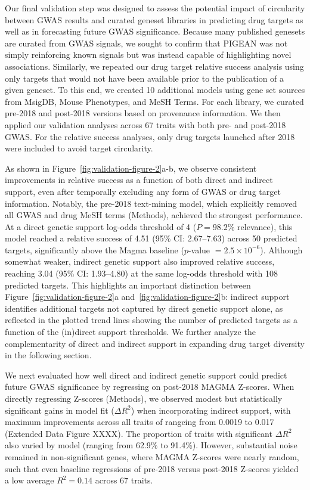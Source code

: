 \documentclass[sn-nature,lineno]{sn-jnl}%
\theoremstyle{thmstyleone}%
\theoremstyle{thmstyletwo}%
\theoremstyle{thmstylethree}%
\begin{document}
Our final validation step was designed to assess the potential impact of circularity between GWAS results and curated geneset libraries in predicting drug targets as well as in forecasting future GWAS significance. Because many published genesets are curated from GWAS signals, we sought to confirm that PIGEAN was not simply reinforcing known signals but was instead capable of highlighting novel associations. Similarly, we repeated our drug target relative success analysis using only targets that would not have been available prior to the publication of a given geneset. To this end, we created 10 additional models using gene set sources from MsigDB, Mouse Phenotypes, and MeSH Terms. For each library, we curated pre-2018 and post-2018 versions based on provenance information. We then applied our validation analyses across 67 traits with both pre- and post-2018 GWAS. For the relative success analyses, only drug targets launched after 2018 were included to avoid target circularity.  

As shown in Figure~\ref{fig:validation-figure-2}a-b, we observe consistent improvements in relative success as a function of both direct and indirect support, even after temporally excluding any form of GWAS or drug target information. Notably, the pre-2018 text-mining model, which explicitly removed all GWAS and drug MeSH terms (Methods), achieved the strongest performance. At a direct genetic support log-odds threshold of 4 ($P=98.2\%$ relevance), this model reached a relative success of 4.51 (95\% CI: 2.67–7.63) across 50 predicted targets, significantly above the Magma baseline ($p$-value $=2.5\times 10^{-6}$). Although somewhat weaker, indirect genetic support also improved relative success, reaching 3.04 (95\% CI: 1.93–4.80) at the same log-odds threshold with 108 predicted targets. This highlights an important distinction between Figure~\ref{fig:validation-figure-2}a and~\ref{fig:validation-figure-2}b: indirect support identifies additional targets not captured by direct genetic support alone, as reflected in the plotted trend lines showing the number of predicted targets as a function of the (in)direct support thresholds. We further analyze the complementarity of direct and indirect support in expanding drug target diversity in the following section.  

We next evaluated how well direct and indirect genetic support could predict future GWAS significance by regressing on post-2018 MAGMA Z-scores. When directly regressing Z-scores (Methods), we observed modest but statistically significant gains in model fit ($\Delta R^2$) when incorporating indirect support, with maximum improvements across all traits of rangeing from 0.0019 to 0.017 (Extended Data Figure XXXX). The proportion of traits with significant $\Delta R^2$ also varied by model (ranging from 62.9\% to 91.4\%). However, substantial noise remained in non-significant genes, where MAGMA Z-scores were nearly random, such that even baseline regressions of pre-2018 versus post-2018 Z-scores yielded a low average $R^2 = 0.14$ across 67 traits.  
\end{document}
